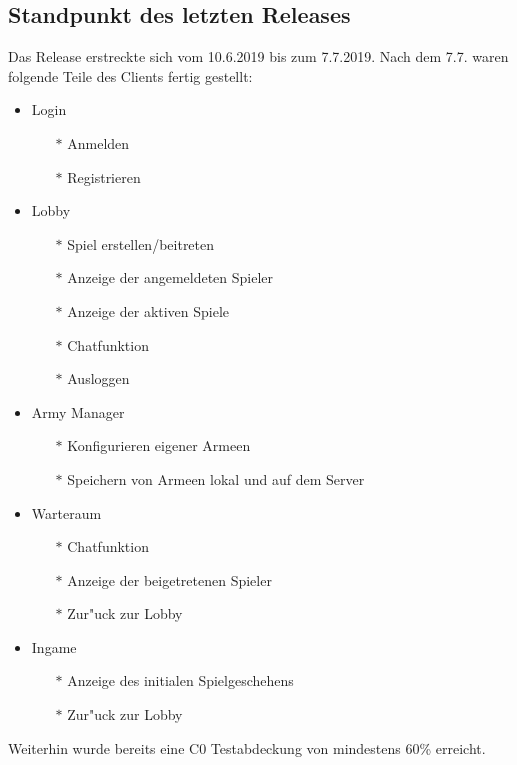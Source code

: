 \documentclass[12pt, titlepage]{scrartcl}
\newcommand{\RN}[1]{%
	\textup{\uppercase\expandafter{\romannumeral#1}}%
}
\begin{document}
        \subsection{Standpunkt des letzten Releases}
            Das Release \RN{2} erstreckte sich vom 10.6.2019 bis zum 7.7.2019. Nach dem 7.7. waren folgende Teile des Clients fertig gestellt:
            \begin{itemize}
                \item Login
                \begin{itemize}
                    \item[$\ast$] Anmelden
                    \item[$\ast$] Registrieren
                \end{itemize}
                \item Lobby
                \begin{itemize}
                    \item[$\ast$] Spiel erstellen/beitreten
                    \item[$\ast$] Anzeige der angemeldeten Spieler 
                    \item[$\ast$] Anzeige der aktiven Spiele
                    \item[$\ast$] Chatfunktion
                    \item[$\ast$] Ausloggen
                \end{itemize}
                \item Army Manager
                \begin{itemize}
                    \item[$\ast$] Konfigurieren eigener Armeen
                    \item[$\ast$] Speichern von Armeen lokal und auf dem Server
                \end{itemize}
                \item Warteraum
                \begin{itemize}
                    \item[$\ast$] Chatfunktion
                    \item[$\ast$] Anzeige der beigetretenen Spieler 
                    \item[$\ast$] Zur"uck zur Lobby
                \end{itemize}
                \item Ingame
                \begin{itemize}
                    \item[$\ast$] Anzeige des initialen Spielgeschehens
                    \item[$\ast$] Zur"uck zur Lobby
                \end{itemize}
            \end{itemize}
            Weiterhin wurde bereits eine C0 Testabdeckung von mindestens 60\% erreicht.
\end{document}
